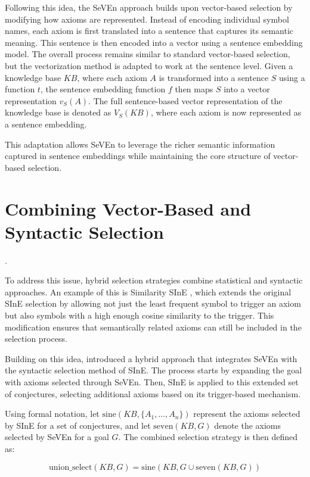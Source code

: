 \documentclass[english,version-2020-11]{uzl-thesis}
\begin{document}
Following this idea, the SeVEn approach builds upon vector-based selection by modifying how axioms are represented. Instead of encoding individual symbol names, each axiom is first translated into a sentence that captures its semantic meaning. This sentence is then encoded into a vector using a sentence embedding model. The overall process remains similar to standard vector-based selection, but the vectorization method is adapted to work at the sentence level. Given a knowledge base \( KB \), where each axiom \( A \) is transformed into a sentence \( S \) using a function \( t \), the sentence embedding function \( f \) then maps \( S \) into a vector representation \( v_S(A) \). The full sentence-based vector representation of the knowledge base is denoted as \( V_S(KB) \), where each axiom is now represented as a sentence embedding.

This adaptation allows SeVEn to leverage the richer semantic information captured in sentence embeddings while maintaining the core structure of vector-based selection.

\section{Combining Vector-Based and Syntactic Selection}.

To address this issue, hybrid selection strategies combine statistical and syntactic approaches. An example of this is Similarity SInE \cite{Furbach2019WordEmbeddings}, which extends the original SInE selection by allowing not just the least frequent symbol to trigger an axiom but also symbols with a high enough cosine similarity to the trigger. This modification ensures that semantically related axioms can still be included in the selection process.

Building on this idea, \cite{Schon2023} introduced a hybrid approach that integrates SeVEn with the syntactic selection method of SInE. The process starts by expanding the goal with axioms selected through SeVEn. Then, SInE is applied to this extended set of conjectures, selecting additional axioms based on its trigger-based mechanism. 

Using formal notation, let \( \text{sine}(KB, \{A_1, ..., A_n\}) \) represent the axioms selected by SInE for a set of conjectures, and let \( \text{seven}(KB, G) \) denote the axioms selected by SeVEn for a goal \( G \). The combined selection strategy is then defined as:

\begin{equation}
    \text{union\_select}(KB, G) = \text{sine}(KB, G \cup \text{seven}(KB, G))
\end{equation}
\end{document}
